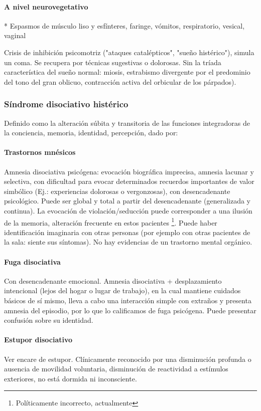\paragraph{A nivel neurovegetativo}
* Espasmos de músculo liso y esfínteres, faringe, vómitos, respiratorio, vesical, vaginal

\faNotesMedical Crisis de inhibición psicomotriz ("ataques catalépticos", "sueño histérico"), simula un coma. Se recupera por técnicas sugestivas o dolorosas. Sin la tríada característica del sueño normal: miosis, estrabismo divergente por el predominio del tono del gran oblicuo, contracción activa del orbicular de los párpados).
\subsubsection*{Síndrome disociativo histérico}
Definido como la alteración súbita y transitoria de las funciones integradoras de la conciencia, memoria, identidad, percepción, dado por:
\paragraph{Trastornos mnésicos}
Amnesia disociativa psicógena: evocación biográfica imprecisa, amnesia lacunar y selectiva, con dificultad para evocar determinados recuerdos importantes de valor simbólico (Ej.: experiencias dolorosas o vergonzosas), con desencadenante psicológico. Puede ser global y total a partir del desencadenante (generalizada y continua). La evocación de violación/seducción puede corresponder a una ilusión de la memoria, alteración frecuente en estos pacientes \footnote{Políticamente incorrecto, actualmente}. Puede haber identificación imaginaria con otras personas (por ejemplo con otras pacientes de la sala: siente sus síntomas). No hay evidencias de un trastorno mental orgánico.
\paragraph{Fuga disociativa}
Con desencadenante emocional. Amnesia disociativa + desplazamiento intencional (lejos del hogar o lugar de trabajo), en la cual mantiene cuidados básicos de sí mismo, lleva a cabo una interacción simple con extraños y presenta amnesia del episodio, por lo que lo calificamos de fuga psicógena. Puede presentar confusión sobre su identidad.
\paragraph{Estupor disociativo}
Ver encare de estupor. Clínicamente reconocido por una disminución profunda o ausencia de movilidad voluntaria, disminución de reactividad a estímulos exteriores, no está dormida ni inconsciente.
